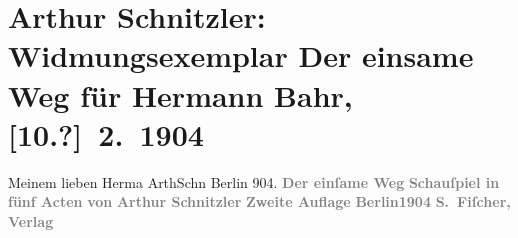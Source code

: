 

         
         \renewcommand{\erwaehntePersonen}{Personen: Hermann Bahr}
         \renewcommand{\erwaehnteInstitutionen}{Institutionen: S. Fischer Verlag}
         \renewcommand{\erwaehnteOrte}{Orte: Berlin, Wien}
         \renewcommand{\erwaehnteWerke}{Werke: Der einsame Weg. Schauspiel in fünf Akten}
               \section[Arthur Schnitzler: Widmungsexemplar Der einsame Weg für Hermann Bahr, {[}10.?{]} 2. 1904]{ Arthur Schnitzler: Widmungsexemplar Der einsame Weg für Hermann Bahr,
               {[}10.?{]} 2. 1904}\nopagebreak{}\rehead{ }\begin{ledgroupsized}[t]{13cm}\normalsize\beginnumbering \toendnotes[C]{\smallbreak\pagebreak[2]} 
\toendnotes[C]{\smallbreak}\pstart
           \noindent{}{\pb}Meinem lieben Herma{\geminationn}\pend
           \pstart \spacefill\mbox{ArthSchn}\pend{}\pstart
           \noindent{}Berlin\label{K_L01371-1v}\label{K_L01371-1h} 904. \pend
           {\bigskip}\pstart
           \noindent{}\centering{}{\pb}\textcolor{gray}{\textbf{\textbf{Der einſame Weg}}}\pend
           \pstart
           \noindent{}\centering{}\textcolor{gray}{\textbf{Schauſpiel in fünf Acten}}\pend
           \pstart
           \noindent{}\centering{}\textcolor{gray}{\textbf{von}}\pend
           \pstart
           \noindent{}\centering{}\textcolor{gray}{\textbf{\textbf{Arthur Schnitzler}}}\pend
           {\bigskip}\pstart
           \noindent{}\centering{}\textcolor{gray}{\textbf{Zweite Auflage}}\pend
           {\bigskip}\pstart
           \noindent{}\centering{}\textcolor{gray}{\textbf{Berlin1904}}\pend
           \pstart
           \noindent{}\centering{}\textcolor{gray}{\textbf{S. Fiſcher, Verlag}}\pend
           
         
         \endnumbering{}\end{ledgroupsized}  \newcommand{\dateiname}{L01371}\newcommand{\titel}{Arthur Schnitzler: Widmungsexemplar Der einsame Weg für Hermann Bahr, [10.?] 2. 1904}\newcommand{\editorInnen}{ Kurt Ifkovits,  Martin Anton Müller}
      